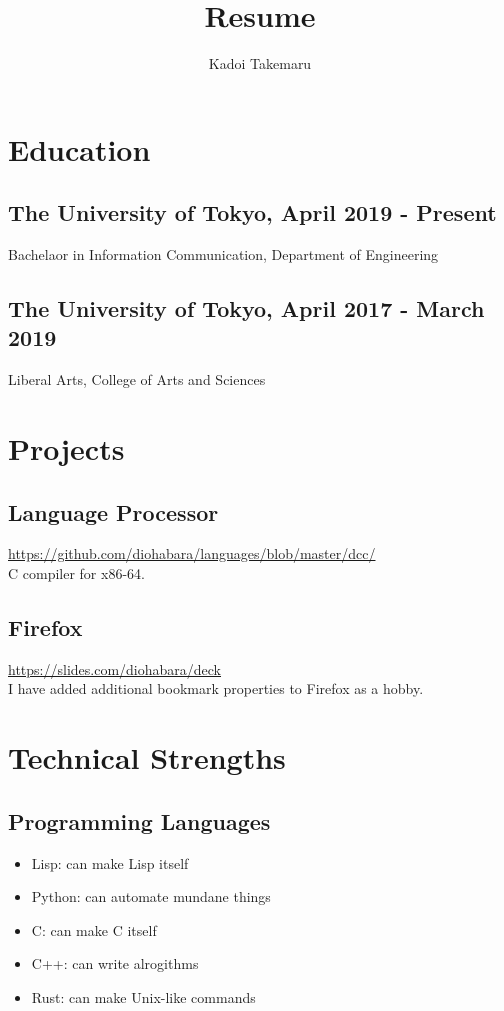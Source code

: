 \documentclass{article}
\title{Resume}
\author{Kadoi Takemaru}
\begin{document}
\maketitle

\section*{Education}
    \subsection*{The University of Tokyo, April 2019 - Present}
        Bachelaor in Information Communication, Department of Engineering
    \subsection*{The University of Tokyo, April 2017 - March 2019}
        Liberal Arts, College of Arts and Sciences

\section*{Projects}
    \subsection*{Language Processor}
        \url{https://github.com/diohabara/languages/blob/master/dcc/}
        \\ C compiler for x86-64.

    \subsection*{Firefox}
        \url{https://slides.com/diohabara/deck}
        \\ I have added additional bookmark properties to Firefox as a hobby.

\section*{Technical Strengths}
    \subsection*{Programming Languages}
        \begin{itemize}
            \item Lisp: can make Lisp itself
            \item Python: can automate mundane things
            \item C: can make C itself
            \item C++: can write alrogithms
            \item Rust: can make Unix-like commands
        \end{itemize}
\end{document}
